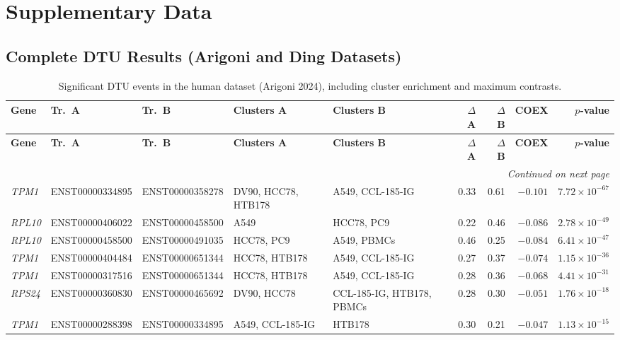 \chapter{Supplementary Data}
\section{Complete DTU Results (Arigoni and Ding Datasets)}

\begin{landscape}
\begingroup
\setlength{\tabcolsep}{3.5pt}
\begin{longtable}{@{} l l l p{2.8cm} p{2.8cm} r r r r @{}}
\caption{Significant DTU events in the human dataset (Arigoni 2024), including cluster enrichment and maximum contrasts.\label{tab:arrigoni_landscape}}\\
\toprule
\textbf{Gene} & \textbf{Tr.~A} & \textbf{Tr.~B} & \textbf{Clusters A} & \textbf{Clusters B} & \textbf{$\Delta$ A} & \textbf{$\Delta$ B} & \textbf{COEX} & \textbf{$p$-value} \\
\midrule
\endfirsthead
\toprule
\textbf{Gene} & \textbf{Tr.~A} & \textbf{Tr.~B} & \textbf{Clusters A} & \textbf{Clusters B} & \textbf{$\Delta$ A} & \textbf{$\Delta$ B} & \textbf{COEX} & \textbf{$p$-value} \\
\midrule
\endhead
\midrule
\multicolumn{9}{r}{\textit{Continued on next page}} \\
\endfoot
\bottomrule
\endlastfoot
\textit{TPM1}   & ENST00000334895 & ENST00000358278 & DV90, HCC78, HTB178 & A549, CCL-185-IG & 0.33 & 0.61 & $-0.101$ & $7.72 \times 10^{-67}$ \\
\textit{RPL10}  & ENST00000406022 & ENST00000458500 & A549 & HCC78, PC9 & 0.22 & 0.46 & $-0.086$ & $2.78 \times 10^{-49}$ \\
\textit{RPL10}  & ENST00000458500 & ENST00000491035 & HCC78, PC9 & A549, PBMCs & 0.46 & 0.25 & $-0.084$ & $6.41 \times 10^{-47}$ \\
\textit{TPM1}   & ENST00000404484 & ENST00000651344 & HCC78, HTB178 & A549, CCL-185-IG & 0.27 & 0.37 & $-0.074$ & $1.15 \times 10^{-36}$ \\
\textit{TPM1}   & ENST00000317516 & ENST00000651344 & HCC78, HTB178 & A549, CCL-185-IG & 0.28 & 0.36 & $-0.068$ & $4.41 \times 10^{-31}$ \\
\textit{RPS24}  & ENST00000360830 & ENST00000465692 & DV90, HCC78 & CCL-185-IG, HTB178, PBMCs & 0.28 & 0.30 & $-0.051$ & $1.76 \times 10^{-18}$ \\
\textit{TPM1}   & ENST00000288398 & ENST00000334895 & A549, CCL-185-IG & HTB178 & 0.30 & 0.21 & $-0.047$ & $1.13 \times 10^{-15}$ \\

\end{longtable}
\end{landscape}
